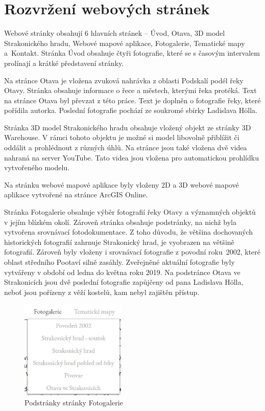\documentclass[thesis=M,czech]{FITthesis}[2012/06/26]
\begin{document}
\section{Rozvržení webových stránek}


Webové stránky obsahují 6 hlavních stránek – Úvod, Otava, 3D model Strakonického hradu, Webové mapové aplikace, Fotogalerie, Tematické mapy a~Kontakt. Stránka Úvod obsahuje čtyři fotografie, které se s časovým intervalem prolínají a krátké představení stránky.



Na stránce Otava je vložena zvuková nahrávka z oblasti Podskalí podél řeky Otavy. Stránka obsahuje informace o řece a městech, kterými řeka protéká. Text na  stránce Otava byl převzat z této práce. Text je doplněn o fotografie řeky, které pořídila autorka. Poslední fotografie pochází ze soukromé sbírky Ladislava Hölla. 

Stránka 3D model Strakonického hradu obsahuje vložený objekt ze stránky 3D Warehouse. V rámci tohoto objektu je možné si model libovolně přiblížit či oddálit a prohlédnout z různých úhlů. Na stránce jsou také vložena dvě videa nahraná na server YouTube. Tato videa jsou vložena pro automatickou prohlídku vytvořeného modelu.

Na stránku webové mapové aplikace byly vloženy 2D a 3D webové mapové aplikace vytvořené na stránce ArcGIS Online. 

Stránka Fotogalerie obsahuje výběr fotografií řeky Otavy a významných objektů v jejím blízkém okolí. Zároveň stránka obsahuje podstránky, na nichž byla vytvořena srovnávací fotodokumentace. Z toho důvodu, že většina dochovaných historických fotografií zahrnuje Strakonický hrad, je vyobrazen na většině fotografií. Zároveň byly vloženy i srovnávací fotografie z povodní roku~2002, které oblast středního Pootaví silně zasáhly. Zveřejněné aktuální fotografie byly vytvářeny v období od ledna do května roku 2019. Na podstránce Otava ve Strakonicích jsou dvě poslední fotografie zapůjčeny od pana Ladislava Hölla, neboť jsou pořízeny z věží kostelů, kam nebyl zajištěn přístup.

\begin{figure}[h]
	\centering
	\includegraphics[width=5cm]{pics/foto.jpg}
	\caption{Podstránky stránky Fotogalerie}
	\label{obrazek:foto}
\end{figure}
\end{document}
